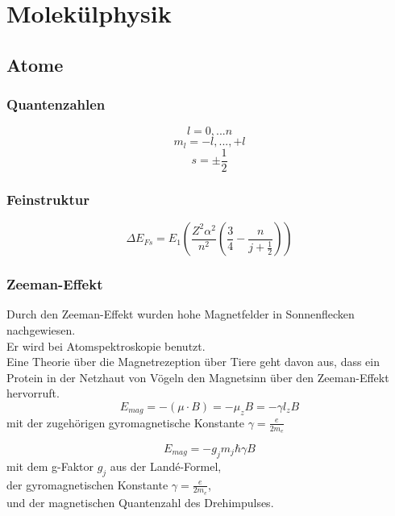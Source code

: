 \chapter{Molekülphysik}
  \section{Atome}
  \subsection{Quantenzahlen}
      \begin{equation}
        l=0, ... n
      \end{equation}
      \begin{equation}
        m_l=-l, ... , +l
      \end{equation}
      \begin{equation}
        s=\pm \frac{1}{2}
      \end{equation}
  \subsection{Feinstruktur}
    \begin{equation}
      \Delta E_{Fs} = E_1 \left( \frac{Z^2\alpha^2}{n^2} \left( \frac{3}{4} - \frac{n}{j+\frac{1}{2}} \right) \right)
    \end{equation}
  \subsection{Zeeman-Effekt}
      Durch den Zeeman-Effekt wurden hohe Magnetfelder in Sonnenflecken nachgewiesen.\\
      Er wird bei Atomspektroskopie benutzt. \\
      Eine Theorie über die Magnetrezeption über Tiere geht davon aus, dass ein Protein in der Netzhaut von Vögeln den Magnetsinn über den Zeeman-Effekt hervorruft. 
      \begin{equation}
        E_{mag}=-\left( \mu \cdot B \right) = -\mu_z B = -\gamma  l_z B
      \end{equation}
      mit der zugehörigen gyromagnetische Konstante $\gamma = \frac{e}{2m_e}$

      \begin{equation}
        E_{mag}=- g_j m_j \hbar  \gamma B
      \end{equation}
      mit dem g-Faktor $g_j$ aus der Land\'{e}-Formel, \\
      der gyromagnetischen Konstante $\gamma = \frac{e}{2m_e}$, \\
      und der magnetischen Quantenzahl des Drehimpulses.
      
